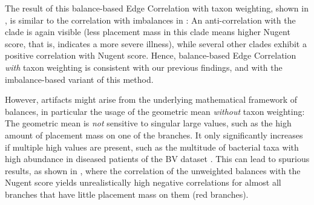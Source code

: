 The result of this balance-based Edge Correlation with taxon weighting,
shown in ,
is similar to the correlation with imbalances in :
An anti-correlation with the  clade is again visible
(less placement mass in this clade means higher Nugent score, that is, indicates a more severe illness),
while several other clades exhibit a positive correlation with Nugent score.
Hence, balance-based Edge Correlation \emph{with} taxon weighting is consistent with our previous findings,
and with the imbalance-based variant of this method.

However, artifacts might arise from the underlying mathematical framework of balances,
in particular the usage of the geometric mean \emph{without} taxon weighting:
The geometric mean is \emph{not} sensitive to singular large values,
such as the high amount of placement mass on one of the  branches.
It only significantly increases if multiple high values are present,
such as the multitude of bacterial taxa with high abundance in diseased patients of the \ac{BV} dataset \cite{Srinivasan2012}.
This can lead to spurious results, as shown in
,
where the correlation of the unweighted balances %
with the Nugent score yields unrealistically high negative correlations
for almost all branches that have little placement mass on them (red branches).

